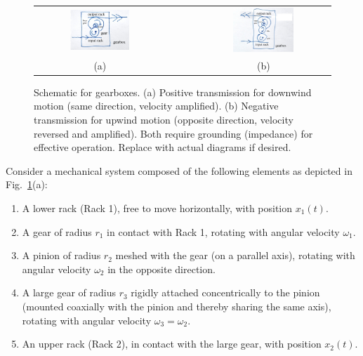 \documentclass[reprint,aps,pra,superscriptaddress,longbibliography]{revtex4-2}
\begin{document}
\begin{figure}[htbp]
    \centering
    \begin{tabular}{ccc}
        \includegraphics[width=0.48\textwidth]{2025-windgww.jpg}
        &$\qquad$&
        \includegraphics[width=0.48\textwidth]{2025-windgaw.jpg}
        \\
        (a)&&(b)
    \end{tabular}
    \caption{Schematic for gearboxes. (a) Positive transmission for downwind motion (same direction, velocity amplified). (b) Negative transmission for upwind motion (opposite direction, velocity reversed and amplified). Both require grounding (impedance) for effective operation. Replace with actual diagrams if desired.}
    \label{fig:gearboxes}
\end{figure}

Consider a mechanical system composed of the following elements as depicted in Fig.~\ref{fig:gearboxes}(a):

\begin{enumerate}
    \item A lower rack (Rack 1), free to move horizontally, with position $x_1(t)$.
    \item A gear of radius $r_1$ in contact with Rack 1, rotating with angular velocity $\omega_1$.
    \item A pinion of radius $r_2$ meshed with the gear (on a parallel axis), rotating with angular velocity $\omega_2$ in the opposite direction.
    \item A large gear of radius $r_3$ rigidly attached concentrically to the pinion (mounted coaxially with the pinion and thereby sharing the same axis), rotating with angular velocity $\omega_3 = \omega_2$.
    \item An upper rack (Rack 2), in contact with the large gear, with position $x_2(t)$.
\end{enumerate}
\end{document}
